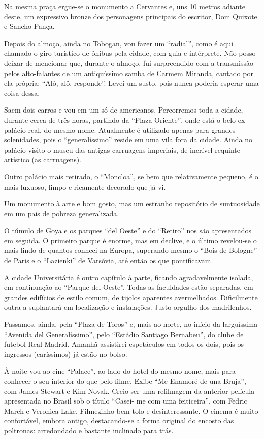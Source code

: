 Na mesma praça ergue-se o monumento a Cervantes e, uns 10 metros adiante deste, um expressivo bronze dos personagens principais do escritor, Dom Quixote e Sancho Pança.

Depois do almoço, ainda no Tobogan, vou fazer um ``radial'', como é aqui chamado o giro turístico de ônibus pela cidade, com guia e intérprete. Não posso deixar de mencionar que, durante o almoço, fui surpreendido com a transmissão pelos alto-falantes de um antiquíssimo samba de Carmem Miranda, cantado por ela própria: ``Alô, alô, responde''. Levei um susto, pois nunca poderia esperar uma coisa dessa.

Saem dois carros e vou em um só de americanos. Percorremos toda a cidade, durante cerca de três horas, partindo da ``Plaza Oriente'', onde está o belo ex-palácio real, do mesmo nome. Atualmente é utilizado apenas para grandes solenidades, pois o ``generalíssimo'' reside em uma vila fora da cidade. Ainda no palácio visito o museu das antigas carruagens imperiais, de incrível requinte artístico (as carruagens).

Outro palácio mais retirado, o ``Moncloa'', se bem que relativamente pequeno, é o mais luxuoso, limpo e ricamente decorado que já vi.

Um monumento à arte e bom gosto, mas um estranho repositório de suntuosidade em um país de pobreza generalizada.

O túmulo de Goya e os parques ``del Oeste'' e do ``Retiro'' nos são apresentados em seguida. O primeiro parque é enorme, mas em declive, e o último revelou-se o mais lindo de quantos conheci na Europa, superando mesmo o ``Bois de Bologne'' de Paris e o ``Lazienki'' de Varsóvia, até então os que pontificavam.

A cidade Universitária é outro capítulo à parte, ficando agradavelmente isolada, em continuação ao ``Parque del Oeste''. Todas as faculdades estão separadas, em grandes edifícios de estilo comum, de tijolos aparentes avermelhados. Dificilmente outra a suplantará em localização e instalações. Justo orgulho dos madrilenhos.

Passamos, ainda, pela ``Plaza de Toros'' e, mais ao norte, no início da larguíssima ``Avenida del Generalíssimo'', pelo ``Estádio Santiago Bernabeu'', do clube de futebol Real Madrid. Amanhã assistirei espetáculos em todos os dois, pois os ingressos (caríssimos) já estão no bolso.

À noite vou ao cine ``Palace'', ao lado do hotel do mesmo nome, mais para conhecer o seu interior do que pelo filme. Exibe ``Me Enamoré de una Bruja'', com James Stewart e Kim Novak. Creio ser uma refilmagem da anterior película apresentada no Brasil sob o título ``Casei- me com uma feiticeira'', com Fedric March e Veronica Lake. Filmezinho bem tolo e desinteressante. O cinema é muito confortável, embora antigo, destacando-se a forma original do encosto das poltronas: arredondado e bastante inclinado para trás.

